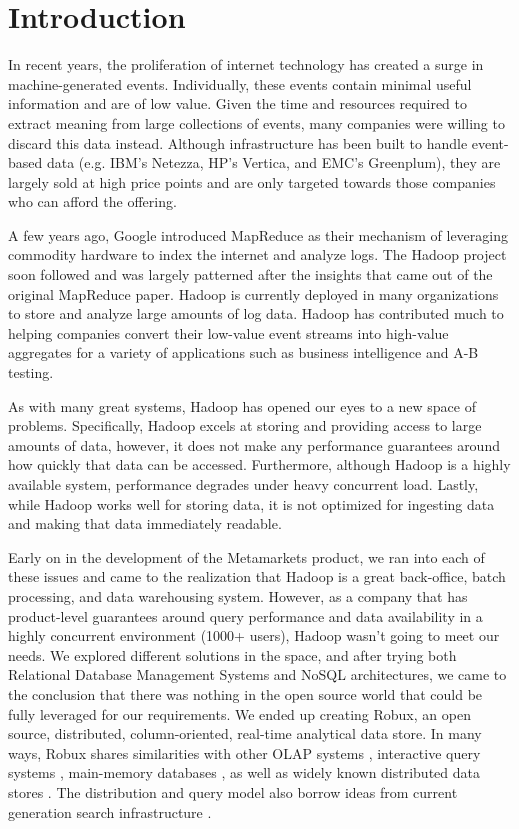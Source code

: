 \documentclass{sig-alternate-2013}
\begin{document}
\section{Introduction}
In recent years, the proliferation of internet technology has
created a surge in machine-generated events. Individually, these
events contain minimal useful information and are of low value. Given the
time and resources required to extract meaning from large collections of
events, many companies were willing to discard this data instead. Although
infrastructure has been built to handle event-based data (e.g. IBM's
Netezza\cite{singh2011introduction}, HP's Vertica\cite{bear2012vertica}, and EMC's
Greenplum\cite{miner2012unified}), they are largely sold at high price points
and are only targeted towards those companies who can afford the offering.

A few years ago, Google introduced MapReduce \cite{dean2008mapreduce} as their
mechanism of leveraging commodity hardware to index the internet and analyze
logs. The Hadoop \cite{shvachko2010hadoop} project soon followed and was
largely patterned after the insights that came out of the original MapReduce
paper. Hadoop is currently deployed in many organizations to store and analyze
large amounts of log data. Hadoop has contributed much to helping companies
convert their low-value event streams into high-value aggregates for a variety
of applications such as business intelligence and A-B testing.

As with many great systems, Hadoop has opened our eyes to a new space of
problems. Specifically, Hadoop excels at storing and providing access to large
amounts of data, however, it does not make any performance guarantees around
how quickly that data can be accessed. Furthermore, although Hadoop is a
highly available system, performance degrades under heavy concurrent load.
Lastly, while Hadoop works well for storing data, it is not optimized for
ingesting data and making that data immediately readable.

Early on in the development of the Metamarkets product, we ran into each of
these issues and came to the realization that Hadoop is a great back-office,
batch processing, and data warehousing system. However, as a company that has
product-level guarantees around query performance and data availability in a
highly concurrent environment (1000+ users), Hadoop wasn't going to meet our
needs. We explored different solutions in the space, and after
trying both Relational Database Management Systems and NoSQL architectures, we
came to the conclusion that there was nothing in the open source world that
could be fully leveraged for our requirements. We ended up creating Robux, an
open source, distributed, column-oriented, real-time analytical data store. In
many ways, Robux shares similarities with other OLAP systems
\cite{oehler2012ibm, schrader2009oracle, lachev2005applied},
interactive query systems \cite{melnik2010dremel}, main-memory databases
\cite{farber2012sap}, as well as widely known distributed data stores
\cite{chang2008bigtable, decandia2007dynamo, lakshman2010cassandra}. The
distribution and query model also borrow ideas from current generation search
infrastructure \cite{linkedin2013senseidb, apache2013solr,
banon2013elasticsearch}.
\end{document}
